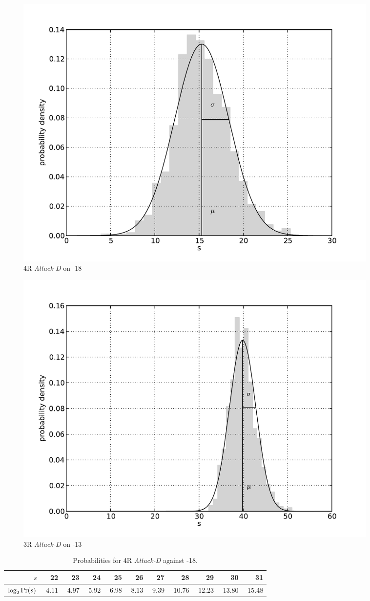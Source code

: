 \begin{figure}[htbp]
 \centering
 \includegraphics[width=0.9\textwidth]{./present-80-18-14-attack-d-histogram.pdf}
 \caption{4R \emph{Attack-D} on -18}
 \label{fig:present-80-18-14-attack-d-histogram}
\end{figure}

\begin{figure}[htbp]
 \centering
 \includegraphics[width=0.9\textwidth]{./present-80-13-10-attack-d-histogram.pdf}
 \caption{3R \emph{Attack-D} on -13}
 \label{fig:present-80-13-10-attack-d-histogram}
\end{figure}

\begin{table}[ht]
\begin{center}
\begin{tabular}{|r|r|r|r|r|r|r|r|r|r|r|}
\hline
$s$                         & 22 & 23 & 24 & 25 & 26 & 27 & 28 & 29 & 30 & 31\\  
\hline
$\log_2 \textnormal{Pr}(s)$ & -4.11 & -4.97 & -5.92&  -6.98 & -8.13& -9.39 & -10.76 & -12.23 & -13.80 & -15.48\\
\hline
\end{tabular}
\end{center}
\caption{Probabilities for 4R \emph{Attack-D} against -18.}
\label{tab:present-80-18-14-attack-d-prob}
\end{table}


